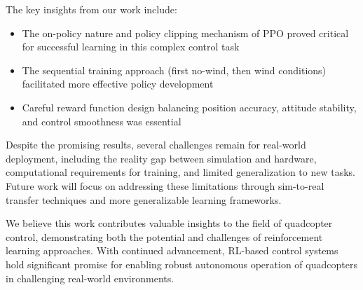 \documentclass[12pt]{article}
\begin{document}

The key insights from our work include:
\begin{itemize}
    \item The on-policy nature and policy clipping mechanism of PPO proved critical for successful learning in this complex control task
    \item The sequential training approach (first no-wind, then wind conditions) facilitated more effective policy development
    \item Careful reward function design balancing position accuracy, attitude stability, and control smoothness was essential
\end{itemize}


Despite the promising results, several challenges remain for real-world deployment, including the reality gap between simulation and hardware, computational requirements for training, and limited generalization to new tasks. Future work will focus on addressing these limitations through sim-to-real transfer techniques and more generalizable learning frameworks.


We believe this work contributes valuable insights to the field of quadcopter control, demonstrating both the potential and challenges of reinforcement learning approaches. With continued advancement, RL-based control systems hold significant promise for enabling robust autonomous operation of quadcopters in challenging real-world environments.

\end{document}
